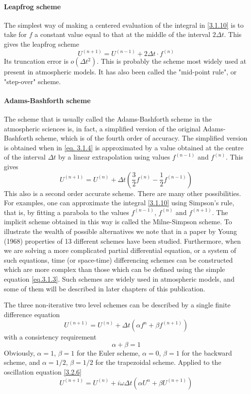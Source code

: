 \paragraph{Leapfrog scheme}
The simplest way of making a centered evaluation of the integral in \ref{3.1.10} is to take for $f$ a constant value equal to that at the middle of the interval $2\Delta t$. This gives the leapfrog scheme
\begin{equation}\label{3.1.11}
    U^{(n+1)}=U^{(n-1)}+2\Delta t\cdot f^{(n)}
\end{equation}
Its truncation error is $o(\Delta t^2)$. This is probably the scheme most widely used at present in atmospheric models. It has also been called the "mid-point rule", or "step-over" scheme.
\paragraph{Adams-Bashforth scheme}
The scheme that is usually called the Adams-Bashforth scheme in the atmospheric sciences is, in fact, a simplified version of the original Adams-Bashforth scheme, which is of the fourth order of accuracy. The simplified version is obtained when 
 in \ref{eq. 3.1.4} is approximated by a value obtained at the centre of the interval $\Delta t$ by a linear extrapolation using values $f^{(n-1)}$ and $f^{(n)}$. This gives
 \begin{equation}\label{3.1.12}
     U^{(n+1)}=U^{(n)}+\Delta t\left(\frac{3}{2}f^{(n)}-\frac{1}{2}f^{(n-1)}\right)
 \end{equation}
 This also is a second order accurate scheme.
 There are many other possibilities. For examples, one can approximate the integral \ref{3.1.10} using Simpson's rule, that is, by fitting a parabola to the values $f^{(n-1)}$, $f^{(n)}$ and $f^{(n+1)}$. 
 The implicit scheme obtained in this way is called the Milne-Simpson scheme. To illustrate the wealth of possible alternatives we note that in a paper by Young (1968) properties of 13 different schemes have been studied. Furthermore, when we are solving a more complicated partial differential equation, or a system of such equations, time (or space-time) differencing schemes can be constructed which are more complex than those which can be defined using the simple equation \ref{eq.3.1.3}. Such schemes are widely used in atmospheric models, and some of them will be described in later chapters of this publication.

 The three non-iterative two level schemes can be described by a single finite difference equation 
 \begin{equation}\label{3.2.6}
     U^{(n+1)}=U^{(n)}+\Delta t\left(\alpha f^n+\beta f^{(n+1)}\right)
 \end{equation}
 with a consistency requirement
 $$\alpha+\beta=1$$
 Obviously, $\alpha=1$, $\beta=1$ for the Euler scheme, $\alpha=0$, $\beta=1$ for the backward scheme, and $\alpha=1/2$, $\beta=1/2$ for the trapezoidal scheme. 
 Applied to the oscillation equation \ref{3.2.6}
 \begin{equation}\label{3.2.7}
     U^{(n+1)}=U^{(n)}+i\omega\Delta t\left(\alpha U^n+\beta U^{(n+1)}\right)
 \end{equation}
